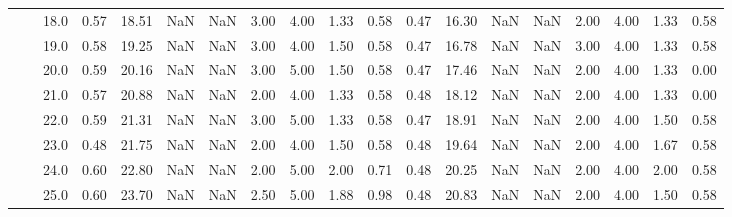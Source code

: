 \begin{tabular}{lllrrrrrrrrrrrrrrrr}
      &     & 18.0 &      0.57 &      18.51 &               NaN &                NaN & 3.00 &   4.00 &             1.33 &                         0.58 &      0.47 &      16.30 &               NaN &                NaN & 2.00 &   4.00 &             1.33 &                         0.58 \\
      &     & 19.0 &      0.58 &      19.25 &               NaN &                NaN & 3.00 &   4.00 &             1.50 &                         0.58 &      0.47 &      16.78 &               NaN &                NaN & 3.00 &   4.00 &             1.33 &                         0.58 \\
      &     & 20.0 &      0.59 &      20.16 &               NaN &                NaN & 3.00 &   5.00 &             1.50 &                         0.58 &      0.47 &      17.46 &               NaN &                NaN & 2.00 &   4.00 &             1.33 &                         0.00 \\
      &     & 21.0 &      0.57 &      20.88 &               NaN &                NaN & 2.00 &   4.00 &             1.33 &                         0.58 &      0.48 &      18.12 &               NaN &                NaN & 2.00 &   4.00 &             1.33 &                         0.00 \\
      &     & 22.0 &      0.59 &      21.31 &               NaN &                NaN & 3.00 &   5.00 &             1.33 &                         0.58 &      0.47 &      18.91 &               NaN &                NaN & 2.00 &   4.00 &             1.50 &                         0.58 \\
      &     & 23.0 &      0.48 &      21.75 &               NaN &                NaN & 2.00 &   4.00 &             1.50 &                         0.58 &      0.48 &      19.64 &               NaN &                NaN & 2.00 &   4.00 &             1.67 &                         0.58 \\
      &     & 24.0 &      0.60 &      22.80 &               NaN &                NaN & 2.00 &   5.00 &             2.00 &                         0.71 &      0.48 &      20.25 &               NaN &                NaN & 2.00 &   4.00 &             2.00 &                         0.58 \\
      &     & 25.0 &      0.60 &      23.70 &               NaN &                NaN & 2.50 &   5.00 &             1.88 &                         0.98 &      0.48 &      20.83 &               NaN &                NaN & 2.00 &   4.00 &             1.50 &                         0.58 \\

\end{tabular}
